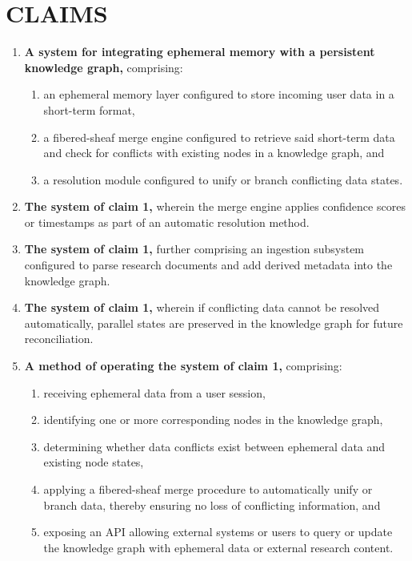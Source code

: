 \documentclass[12pt]{article}
\begin{document}
\section*{CLAIMS}
\begin{enumerate}
\item \textbf{A system for integrating ephemeral memory with a persistent knowledge graph,}
comprising:
\begin{enumerate}
  \item an ephemeral memory layer configured to store incoming user data in a short-term format,
  \item a fibered-sheaf merge engine configured to retrieve said short-term data and check 
        for conflicts with existing nodes in a knowledge graph, and
  \item a resolution module configured to unify or branch conflicting data states.
\end{enumerate}

\item \textbf{The system of claim 1,} wherein the merge engine applies confidence scores or
timestamps as part of an automatic resolution method.

\item \textbf{The system of claim 1,} further comprising an ingestion subsystem configured
to parse research documents and add derived metadata into the knowledge graph.

\item \textbf{The system of claim 1,} wherein if conflicting data cannot be resolved automatically,
parallel states are preserved in the knowledge graph for future reconciliation.

\item \textbf{A method of operating the system of claim 1,} comprising:
\begin{enumerate}
  \item receiving ephemeral data from a user session,
  \item identifying one or more corresponding nodes in the knowledge graph,
  \item determining whether data conflicts exist between ephemeral data and existing node states,
  \item applying a fibered-sheaf merge procedure to automatically unify or branch data, 
        thereby ensuring no loss of conflicting information, and
  \item exposing an API allowing external systems or users to query or update the knowledge graph 
        with ephemeral data or external research content.
\end{enumerate}
\end{enumerate}
\end{document}
